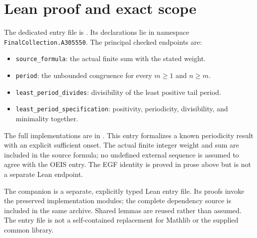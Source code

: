 \documentclass[11pt,a4paper]{article}
\theoremstyle{remark}
\begin{document}
\section{Lean proof and exact scope}
The dedicated entry file is . Its declarations lie in namespace \texttt{FinalCollection.A305550}. The principal checked endpoints are:
\begin{itemize}[nosep]
\item \texttt{source\_formula}: the actual finite sum with the stated weight.
\item \texttt{period}: the unbounded congruence for every $m\ge1$ and $n\ge m$.
\item \texttt{least\_period\_divides}: divisibility of the least positive tail period.
\item \texttt{least\_period\_specification}: positivity, periodicity, divisibility, and minimality together.
\end{itemize}
The full implementations are in .
This entry formalizes a known periodicity result with an explicit sufficient onset. The actual finite integer weight and sum are included in the source formula; no undefined external sequence is assumed to agree with the OEIS entry. The EGF identity is proved in prose above but is not a separate Lean endpoint. 

The companion is a separate, explicitly typed Lean entry file. Its proofs
invoke the preserved implementation modules; the complete dependency source
is included in the same archive. Shared lemmas are reused rather than
assumed. The entry file is not a self-contained replacement for Mathlib or
the supplied common library.
\end{document}
